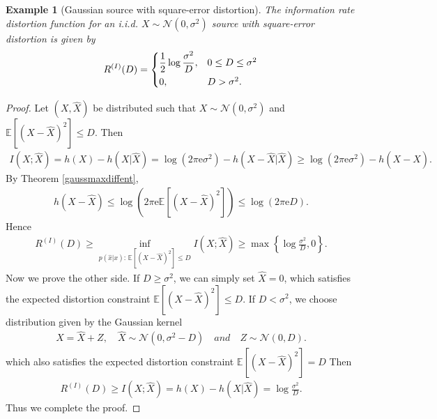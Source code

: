 \documentclass{article}
\numberwithin{equation}{section}
\newcommand{\e}{\mathrm{e}}
\newcommand{\E}{\mathbb{E}}
\renewcommand{\cal}{\mathcal}
\newcommand{\wh}{\widehat}
\theoremstyle{plain}
\newtheorem{example}[theorem]{Example}
\theoremstyle{definition}
\begin{document}
\begin{example}[Gaussian source with square-error distortion]
The information rate distortion function for an i.i.d. $X\sim\cal{N}(0,\sigma^2)$ source with square-error distortion is given by
\begin{align*}
	R^{(I)}(D)=\begin{cases}
		\displaystyle\frac{1}{2}\log\frac{\sigma^2}{D}, &0\leq D\leq\sigma^2\vspace{0.1cm}\\
		0, &D>\sigma^2.
	\end{cases}
\end{align*}
\end{example}
\begin{proof}
Let $(X,\wh{X})$ be distributed such that $X\sim\cal{N}(0,\sigma^2)$ and $\E\left[(X-\wh{X})^2\right]\leq D$. Then
\begin{align*}
	I(X;\wh{X})=h(X)-h(X|\wh{X})=\log(2\pi\e\sigma^2)-h(X-\wh{X}|\wh{X})\geq\log(2\pi\e\sigma^2)-h(X-\wh{X}). 
\end{align*}
By Theorem \ref{gaussmaxdiffent},
\begin{align*}
	h(X-\wh{X})\leq\log\left(2\pi\e\E\left[(X-\wh{X})^2\right]\right)\leq \log(2\pi\e D).
\end{align*}
Hence
\begin{align*}
	R^{(I)}(D)\geq\inf_{p(\wh{x}|x):\,\E[(X-\wh{X})^2]\leq D}I(X;\wh{X})\geq\max\left\{\log\frac{\sigma^2}{D},0\right\}.
\end{align*}
Now we prove the other side. If $D\geq\sigma^2$, we can simply set $\wh{X}=0$, which satisfies the expected distortion constraint $\E[(X-\wh{X})^2]\leq D$. If $D<\sigma^2$, we choose distribution given by the Gaussian kernel
\begin{align*}
	X=\wh{X}+Z,\quad \wh{X}\sim\cal{N}(0,\sigma^2-D)\quad and\quad Z\sim\cal{N}(0,D).
\end{align*}
which also satisfies the expected distortion constraint $\E[(X-\wh{X})^2]=D$ Then
\begin{align*}
	R^{(I)}(D)\geq I(X;\wh{X})=h(X)-h(X|\wh{X})=\log\frac{\sigma^2}{D}.
\end{align*}
Thus we complete the proof.
\end{proof}
\end{document}
